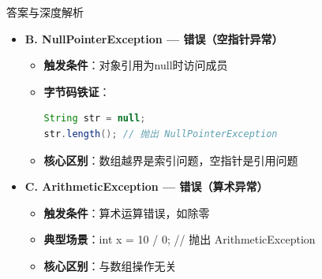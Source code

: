 \documentclass[12pt, a4paper]{ctexart}
\begin{document}
\begin{enumerate}[label=\textbf{\arabic*.}]
\begin{bluebox}{答案与深度解析}
\begin{itemize}[label={}, leftmargin=*, nosep]
\begin{itemize}[label={}, leftmargin=*, nosep]
			      \item \textbf{RuntimeException深度解析}：
			            \begin{itemize}[label={}, leftmargin=*, nosep]
				            \item 属于RuntimeException（未检查异常）
				            \item JLS §14.17 规定数组访问自动边界检查
				            \item 常见场景：循环索引误用、动态数组操作
			            \end{itemize}

			      \item \textbf{命题陷阱破解}：
			            \begin{itemize}[label={}, leftmargin=*, nosep]
				            \item 干扰项："数组长度为5，访问arr[4]会越界" → 错！arr[4]是第5个元素，合法
				            \item \textbf{必考结论}：数组索引从0开始，最大有效索引为length-1
			            \end{itemize}
		      \end{itemize}

		      \item \textbf{B. NullPointerException — 错误（空指针异常）}
		      \begin{itemize}[label={}, leftmargin=*, nosep]
			      \item \textbf{触发条件}：对象引用为null时访问成员
			      \item \textbf{字节码铁证}：
			            \begin{lstlisting}[language=Java]
String str = null;
str.length(); // 抛出 NullPointerException
      \end{lstlisting}
			      \item \textbf{核心区别}：数组越界是索引问题，空指针是引用问题
		      \end{itemize}

		      \item \textbf{C. ArithmeticException — 错误（算术异常）}
		      \begin{itemize}[label={}, leftmargin=*, nosep]
			      \item \textbf{触发条件}：算术运算错误，如除零
			      \item \textbf{典型场景}：int x = 10 / 0; // 抛出 ArithmeticException
			      \item \textbf{核心区别}：与数组操作无关
		      \end{itemize}


\end{itemize}
\end{bluebox}
\end{enumerate}
\end{document}
